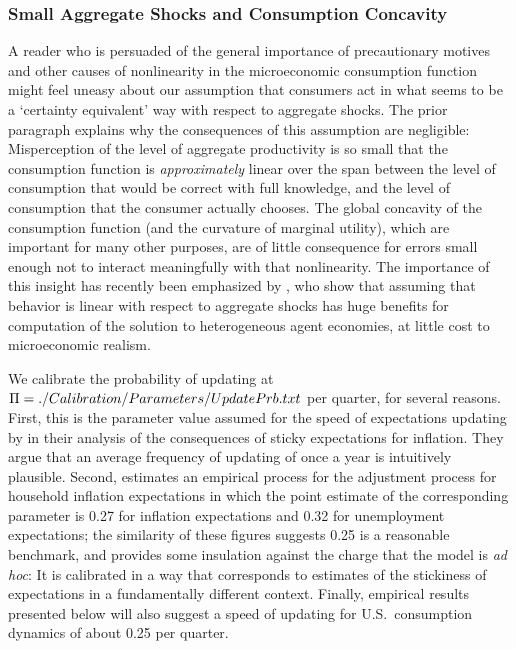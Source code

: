 \documentclass[titlepage]{\econtex}
\begin{document}
\hypertarget{ConcavityAggImp}{}
\subsubsection{Small Aggregate Shocks and Consumption Concavity}
A reader who is persuaded of the general importance of precautionary motives and other causes of nonlinearity in the microeconomic consumption function might feel uneasy about our assumption that consumers act in what seems to be a `certainty equivalent' way with respect to aggregate shocks.  The prior paragraph explains why the consequences of this assumption are negligible: Misperception of the level of aggregate productivity is so small that the consumption function is \textit{approximately} linear over the span between the level of consumption that would be correct with full knowledge, and the level of consumption that the consumer actually chooses.  The global concavity of the consumption function (and the curvature of marginal utility), which are important for many other purposes, are of little consequence for errors small enough not to interact meaningfully with that nonlinearity.  The importance of this insight has recently been emphasized by \cite{bmpMITshocks}, who show that assuming that behavior is linear with respect to aggregate shocks has huge benefits for computation of the solution to heterogeneous agent economies, at little cost to microeconomic realism.

We calibrate the probability of updating at $\Pi=  {./Calibration/Parameters/UpdatePrb.txt}$ per quarter, for several reasons.  First, this is the parameter value assumed for the speed of expectations updating by \cite{mrSlumps} in their analysis of the consequences of sticky expectations for inflation.  They argue that an average frequency of updating of once a year is intuitively plausible.  Second, \cite{carroll:epidemicinflQJE} estimates an empirical process for the adjustment process for household inflation expectations in which the point estimate of the corresponding parameter is 0.27 for inflation expectations and 0.32 for unemployment expectations; the similarity of these figures suggests 0.25 is a reasonable benchmark, and provides some insulation against the charge that the model is {\it ad hoc}: It is calibrated in a way that corresponds to estimates of the stickiness of expectations in a fundamentally different context.  Finally, empirical results presented below will also suggest a speed of updating for U.S.\ consumption dynamics of about 0.25 per quarter.
\end{document}
